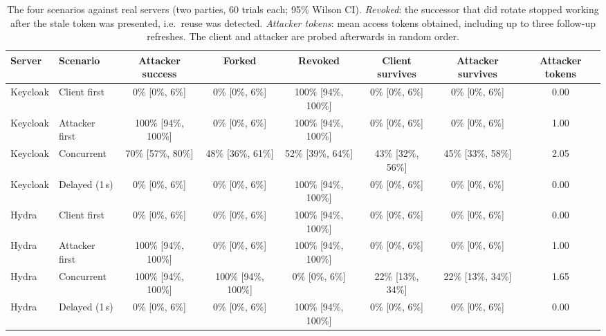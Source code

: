 \begin{table}[htbp]
\centering
\caption{The four scenarios against real servers (two parties, 60 trials each; 95\% Wilson CI). \emph{Revoked}: the successor that did rotate stopped working after the stale token was presented, i.e.\ reuse was detected. \emph{Attacker tokens}: mean access tokens obtained, including up to three follow-up refreshes. The client and attacker are probed afterwards in random order.}
\label{tab:server-scenarios}
\begin{tabular}{llcccccc}
\toprule
Server & Scenario & Attacker success & Forked & Revoked & Client survives & Attacker survives & Attacker tokens \\
\midrule
Keycloak & Client first & 0\% [0\%, 6\%] & 0\% [0\%, 6\%] & 100\% [94\%, 100\%] & 0\% [0\%, 6\%] & 0\% [0\%, 6\%] & 0.00 \\
Keycloak & Attacker first & 100\% [94\%, 100\%] & 0\% [0\%, 6\%] & 100\% [94\%, 100\%] & 0\% [0\%, 6\%] & 0\% [0\%, 6\%] & 1.00 \\
Keycloak & Concurrent & 70\% [57\%, 80\%] & 48\% [36\%, 61\%] & 52\% [39\%, 64\%] & 43\% [32\%, 56\%] & 45\% [33\%, 58\%] & 2.05 \\
Keycloak & Delayed (1\,s) & 0\% [0\%, 6\%] & 0\% [0\%, 6\%] & 100\% [94\%, 100\%] & 0\% [0\%, 6\%] & 0\% [0\%, 6\%] & 0.00 \\
\midrule
Hydra & Client first & 0\% [0\%, 6\%] & 0\% [0\%, 6\%] & 100\% [94\%, 100\%] & 0\% [0\%, 6\%] & 0\% [0\%, 6\%] & 0.00 \\
Hydra & Attacker first & 100\% [94\%, 100\%] & 0\% [0\%, 6\%] & 100\% [94\%, 100\%] & 0\% [0\%, 6\%] & 0\% [0\%, 6\%] & 1.00 \\
Hydra & Concurrent & 100\% [94\%, 100\%] & 100\% [94\%, 100\%] & 0\% [0\%, 6\%] & 22\% [13\%, 34\%] & 22\% [13\%, 34\%] & 1.65 \\
Hydra & Delayed (1\,s) & 0\% [0\%, 6\%] & 0\% [0\%, 6\%] & 100\% [94\%, 100\%] & 0\% [0\%, 6\%] & 0\% [0\%, 6\%] & 0.00 \\
\bottomrule
\end{tabular}
\end{table}
